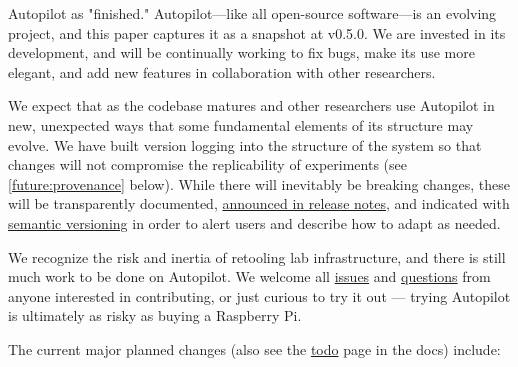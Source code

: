 


 Autopilot as "finished." Autopilot---like all open-source software---is an evolving project, and this paper captures it as a snapshot at v0.5.0. We are invested in its development, and will be continually working to fix bugs, make its use more elegant, and add new features in collaboration with other researchers. 

We expect that as the codebase matures and other researchers use Autopilot in new, unexpected ways that some fundamental elements of its structure may evolve. We have built version logging into the structure of the system so that changes will not compromise the replicability of experiments (see \ref{future:provenance} below). While there will inevitably be breaking changes, these will be transparently documented, \href{https://docs.auto-pi-lot.com/en/latest/changelog/index.html}{announced in release notes}, and indicated with \href{https://semver.org/}{semantic versioning} in order to alert users and describe how to adapt as needed. 

We recognize the risk and inertia of retooling lab infrastructure, and there is still much work to be done on Autopilot. We welcome all \href{https://github.com/auto-pi-lot/autopilot}{issues} and \href{https://github.com/auto-pi-lot/autopilot/discussions}{questions} from anyone interested in contributing, or just curious to try it out --- trying Autopilot is ultimately as risky as buying a Raspberry Pi. 

The current major planned changes (also see the \href{https://docs.auto-pi-lot.com/en/latest/todo.html}{todo} page in the docs) include:



